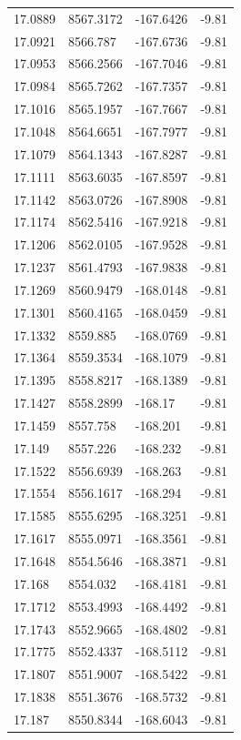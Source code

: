 \begin{table}[H]
\begin{tabular}{llll}
17.0889 & 8567.3172 & -167.6426 & -9.81 \\
17.0921 & 8566.787 & -167.6736 & -9.81 \\
17.0953 & 8566.2566 & -167.7046 & -9.81 \\
17.0984 & 8565.7262 & -167.7357 & -9.81 \\
17.1016 & 8565.1957 & -167.7667 & -9.81 \\
17.1048 & 8564.6651 & -167.7977 & -9.81 \\
17.1079 & 8564.1343 & -167.8287 & -9.81 \\
17.1111 & 8563.6035 & -167.8597 & -9.81 \\
17.1142 & 8563.0726 & -167.8908 & -9.81 \\
17.1174 & 8562.5416 & -167.9218 & -9.81 \\
17.1206 & 8562.0105 & -167.9528 & -9.81 \\
17.1237 & 8561.4793 & -167.9838 & -9.81 \\
17.1269 & 8560.9479 & -168.0148 & -9.81 \\
17.1301 & 8560.4165 & -168.0459 & -9.81 \\
17.1332 & 8559.885 & -168.0769 & -9.81 \\
17.1364 & 8559.3534 & -168.1079 & -9.81 \\
17.1395 & 8558.8217 & -168.1389 & -9.81 \\
17.1427 & 8558.2899 & -168.17 & -9.81 \\
17.1459 & 8557.758 & -168.201 & -9.81 \\
17.149 & 8557.226 & -168.232 & -9.81 \\
17.1522 & 8556.6939 & -168.263 & -9.81 \\
17.1554 & 8556.1617 & -168.294 & -9.81 \\
17.1585 & 8555.6295 & -168.3251 & -9.81 \\
17.1617 & 8555.0971 & -168.3561 & -9.81 \\
17.1648 & 8554.5646 & -168.3871 & -9.81 \\
17.168 & 8554.032 & -168.4181 & -9.81 \\
17.1712 & 8553.4993 & -168.4492 & -9.81 \\
17.1743 & 8552.9665 & -168.4802 & -9.81 \\
17.1775 & 8552.4337 & -168.5112 & -9.81 \\
17.1807 & 8551.9007 & -168.5422 & -9.81 \\
17.1838 & 8551.3676 & -168.5732 & -9.81 \\
17.187 & 8550.8344 & -168.6043 & -9.81 \\

\end{tabular}
\end{table}
